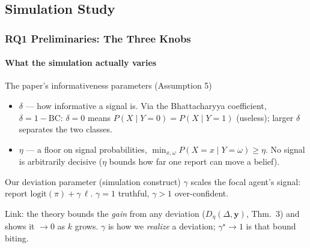 \documentclass[
	11pt, %
]{beamer}
\begin{document}
\subsection{Simulation Study}

\begin{frame}
	\frametitle{RQ1 Preliminaries: The Three Knobs}
	\framesubtitle{What the simulation actually varies}
	\small

	\begin{block}{The paper's informativeness parameters (Assumption 5)}
		\begin{itemize}
			\item $\delta$ --- \alert{how informative} a signal is.
			Via the Bhattacharyya coefficient, $\delta = 1-\mathrm{BC}$:
			$\delta = 0$ means $P(X\mid Y{=}0)=P(X\mid Y{=}1)$ (useless);
			larger $\delta$ separates the two classes.
			\item $\eta$ --- a \alert{floor on signal probabilities},
			$\min_{x,\omega} P(X{=}x\mid Y{=}\omega)\ge\eta$.
			No signal is arbitrarily decisive ($\eta$ bounds how far one report can move a belief).
		\end{itemize}
	\end{block}

	\begin{block}{Our deviation parameter (simulation construct)}
		$\gamma$ scales the focal agent's signal: report
		$\mathrm{logit}(\pi) + \gamma\,\ell$.
		$\gamma=1$ truthful, $\gamma>1$ over-confident.
	\end{block}

	\centering
	\alert{Link:} the theory bounds the \emph{gain} from any deviation
	($D_\eta(\Delta,\mathbf{y})$, Thm.~3) and shows it $\to 0$ as $k$ grows.
	$\gamma$ is how we \emph{realize} a deviation; $\gamma^\star\!\to\!1$ is that bound biting.
\end{frame}
\end{document}
